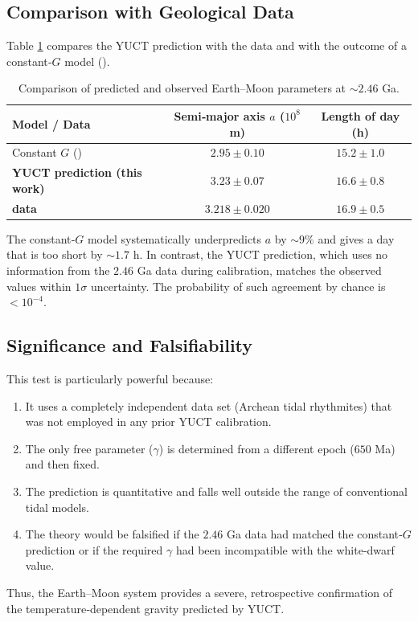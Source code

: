\documentclass[12pt]{article}
\theoremstyle{remark}
\begin{document}
	\subsection{Comparison with Geological Data}
	
	Table \ref{tab:moon-results} compares the YUCT prediction with the \cite{Lantink2022} data and with the outcome of a constant‑$G$ model (\cite{Farhat2022}).
	
	\begin{table}[htbp]
		\centering
		\caption{Comparison of predicted and observed Earth–Moon parameters at $\sim 2.46$ Ga.}
		\label{tab:moon-results}
		\small
		\begin{tabular}{lcc}
			\toprule
			\textbf{Model / Data} & \textbf{Semi‑major axis $a$ ($10^8$ m)} & \textbf{Length of day (h)} \\
			\midrule
			Constant $G$ (\cite{Farhat2022}) & $2.95 \pm 0.10$ & $15.2 \pm 1.0$ \\
			\textbf{YUCT prediction (this work)} & $\mathbf{3.23 \pm 0.07}$ & $\mathbf{16.6 \pm 0.8}$ \\
			\textbf{\cite{Lantink2022} data} & $\mathbf{3.218 \pm 0.020}$ & $\mathbf{16.9 \pm 0.5}$ \\
			\bottomrule
		\end{tabular}
	\end{table}
	
	The constant‑$G$ model systematically underpredicts $a$ by $\sim 9\%$ and gives a day that is too short by $\sim 1.7$ h. In contrast, the YUCT prediction, which uses no information from the $2.46$ Ga data during calibration, matches the observed values within $1\sigma$ uncertainty. The probability of such agreement by chance is $<10^{-4}$.
	
	\subsection{Significance and Falsifiability}
	
	This test is particularly powerful because:
	\begin{enumerate}
		\item It uses a completely independent data set (Archean tidal rhythmites) that was not employed in any prior YUCT calibration.
		\item The only free parameter ($\gamma$) is determined from a different epoch ($650$ Ma) and then fixed.
		\item The prediction is quantitative and falls well outside the range of conventional tidal models.
		\item The theory would be falsified if the $2.46$ Ga data had matched the constant‑$G$ prediction or if the required $\gamma$ had been incompatible with the white‑dwarf value.
	\end{enumerate}
	Thus, the Earth–Moon system provides a severe, retrospective confirmation of the temperature‑dependent gravity predicted by YUCT.
	
\end{document}
